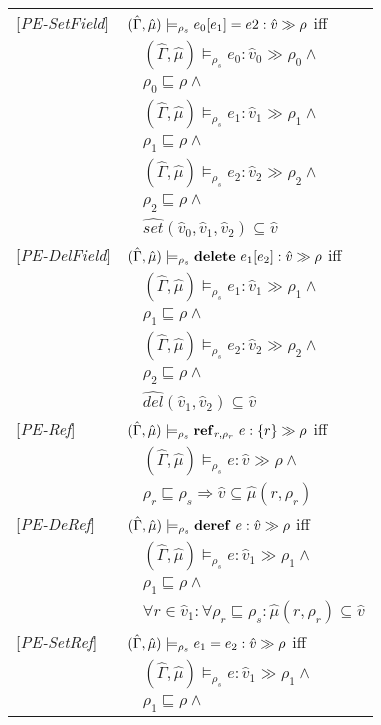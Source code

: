 \documentclass[[12pt,a4paper,twoside,openrigh]{article}
\newcommand{\vat}[0]{\hat{v}}
\newcommand{\muat}[0]{\hat{\mu}}
\newcommand{\Env}[0]{\hat{\Gamma}}
\newcommand{\modelrho}{\models_{\rho_s}}
\newcommand{\aenvs}{(\Env,\muat)}
\newcommand{\caesti}[2]{\aenvs \modelrho #1 : \vat_{#2} \gg \rho_{#2}}
\newcommand{\caest}[1]{\aenvs \modelrho #1 : \vat \gg \rho}
\begin{document}
\begin{tabular} {l l l l}
{[\textit{PE-SetField}]}&\multicolumn{3}{l}{$\caest {\store {e_0} {e_1} {e2}} $ iff}\\
&&\multicolumn{2}{l}{$ \caesti {e_0} {0} \wedge $}\\
&&\multicolumn{2}{l}{$\rho_0 \sqsubseteq \rho \wedge$} \\
&&\multicolumn{2}{l}{$ \caesti {e_1} {1} \wedge $} \\
&&\multicolumn{2}{l}{$\rho_1 \sqsubseteq \rho \wedge$} \\
&&\multicolumn{2}{l}{$ \caesti {e_2} {2} \wedge $} \\
&&\multicolumn{2}{l}{$\rho_2 \sqsubseteq \rho \wedge$} \\
&&\multicolumn{2}{l}{$\widehat{set} (\vat_0, \vat_1, \vat_2) \subseteq \vat$} \\
{[\textit{PE-DelField}]}&\multicolumn{3}{l}{$\caest {\delete {e_1} {e_2}} $ iff}\\
&&\multicolumn{2}{l}{$ \caesti {e_1} {1} \wedge$}\\
&&\multicolumn{2}{l}{$\rho_1 \sqsubseteq \rho \wedge$} \\
&&\multicolumn{2}{l}{$ \caesti {e_2} {2} \wedge $} \\
&&\multicolumn{2}{l}{$\rho_2 \sqsubseteq \rho \wedge$} \\
&&\multicolumn{2}{l}{$\widehat{del} (\vat_1, \vat_2) \subseteq \vat$}\\
{[\textit{PE-Ref}]}&\multicolumn{3}{l}{$ \aenvs \modelrho \newref {r,\rho_r} {e} :\{r\} \gg \rho $ iff}\\
&&\multicolumn{2}{l}{$ \caest {e} \wedge $}\\
&&\multicolumn{2}{l}{$\rho_r \sqsubseteq \rho_s \Rightarrow \vat \subseteq \muat(r, \rho_r) $} \\
{[\textit{PE-DeRef}]}&\multicolumn{3}{l}{$\caest {\deref {e}} $ iff}\\
&&\multicolumn{2}{l}{$\caesti {e} {1} \wedge $}\\
&&\multicolumn{2}{l}{$\rho_1 \sqsubseteq \rho \wedge$ }\\
&&\multicolumn{2}{l}{$\forall r \in \vat_1 : \forall \rho_r \sqsubseteq \rho_s : \muat(r, \rho_r) \subseteq \vat$ }\\
{[\textit{PE-SetRef}]}&\multicolumn{3}{l}{$\caest {\setref {e_1} {e_2}} $ iff}\\
&&\multicolumn{2}{l}{$ \caesti {e} {1} \wedge $}\\
&&\multicolumn{2}{l}{$\rho_1 \sqsubseteq \rho \wedge$} \\

\end{tabular}
\end{document}
